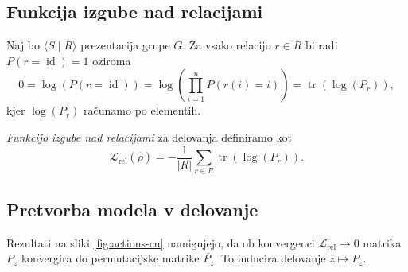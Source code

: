\documentclass[mat2, tisk]{fmfdelo}
\newcommand{\Loss}[1]{\mathcal L _\text{#1}}
\begin{document}
\subsection{Funkcija izgube nad relacijami}
Naj bo $\langle S \mid R \rangle$ prezentacija grupe $G$. Za vsako
relacijo $r \in R$ bi radi $P(r = \operatorname{id})
=1$ oziroma
$$0 = \log(P(r=\operatorname{id})) =
\log(\prod_{i=1}^n P(r(i)=i)) =
\operatorname{tr}(\log(P_r)),$$
kjer $\log(P_r)$
računamo po elementih.
\begin{definicija}
  \emph{Funkcijo izgube nad relacijami} za delovanja
  definiramo kot
  \begin{equation}
    \label{eq:relation loss actions}
    \Loss{rel} (\hat\rho) = - \frac{1}{|R|} \sum_{r \in
    R} \operatorname{tr}(\log(P_r)).
  \end{equation}
\end{definicija}
\subsection{Pretvorba modela v delovanje}
\label{section:pretvorba modela v delovanje}
Rezultati na sliki \ref{fig:actions-cn} namigujejo, da
ob konvergenci $\Loss{rel} \to 0$ matrika
$P_z$ konvergira do permutacijske matrike
$\overline{P_z}$. To inducira delovanje
$z \mapsto P_z$.
\end{document}
